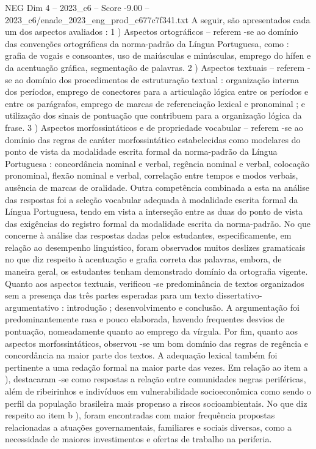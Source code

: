 \begin{textsample}{NEG Dim 4 – 2023\_c6 – Score -9.00 – 2023\_c6/enade\_2023\_eng\_prod\_c677c7f341.txt}
A seguir, são apresentados cada um dos aspectos avaliados : 1 ) Aspectos ortográficos – referem -se ao domínio das convenções ortográficas da norma-padrão da Língua Portuguesa, como : grafia de vogais e consoantes, uso de maiúsculas e minúsculas, emprego do hífen e da acentuação gráfica, segmentação de palavras. 2 ) Aspectos textuais – referem -se ao domínio dos procedimentos de estruturação textual : organização interna dos períodos, emprego de conectores para a articulação lógica entre os períodos e entre os parágrafos, emprego de marcas de referenciação lexical e pronominal ; e utilização dos sinais de pontuação que contribuem para a organização lógica da frase. 3 ) Aspectos morfossintáticos e de propriedade vocabular – referem -se ao domínio das regras de caráter morfossintático estabelecidas como modelares do ponto de vista da modalidade escrita formal da norma-padrão da Língua Portuguesa : concordância nominal e verbal, regência nominal e verbal, colocação pronominal, flexão nominal e verbal, correlação entre tempos e modos verbais, ausência de marcas de oralidade.
Outra competência combinada a esta na análise das respostas foi a seleção vocabular adequada à modalidade escrita formal da Língua Portuguesa, tendo em vista a interseção entre as duas do ponto de vista das exigências do registro formal da modalidade escrita da norma-padrão.
No que concerne à análise das respostas dadas pelos estudantes, especificamente, em relação ao desempenho linguístico, foram observados muitos deslizes gramaticais no que diz respeito à acentuação e grafia correta das palavras, embora, de maneira geral, os estudantes tenham demonstrado domínio da ortografia vigente.
Quanto aos aspectos textuais, verificou -se predominância de textos organizados sem a presença das três partes esperadas para um texto dissertativo-argumentativo : introdução ; desenvolvimento e conclusão.
A argumentação foi predominantemente rasa e pouco elaborada, havendo frequentes desvios de pontuação, nomeadamente quanto ao emprego da vírgula.
Por fim, quanto aos aspectos morfossintáticos, observou -se um bom domínio das regras de regência e concordância na maior parte dos textos.
A adequação lexical também foi pertinente a uma redação formal na maior parte das vezes.
Em relação ao item a ), destacaram -se como respostas a relação entre comunidades negras periféricas, além de ribeirinhos e indivíduos em vulnerabilidade socioeconômica como sendo o perfil da população brasileira mais propenso a riscos socioambientais.
No que diz respeito ao item b ), foram encontradas com maior frequência propostas relacionadas a atuações governamentais, familiares e sociais diversas, como a necessidade de maiores investimentos e ofertas de trabalho na periferia.

\end{textsample}
